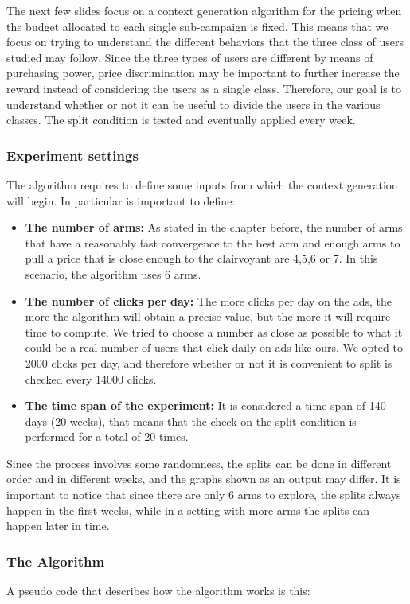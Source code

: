 The next few slides focus on a context generation algorithm for the pricing when the budget allocated to each single sub-campaign is fixed. This means that we focus on trying to understand the different behaviors that the three class of users studied may follow. Since the three types of users are different by means of purchasing power, price discrimination may be important to further increase the reward instead of considering the users as a single class. Therefore, our goal is to understand whether or not it can be useful to divide the users in the various classes. The split condition is tested and eventually applied every week.
\subsubsection{Experiment settings}
The algorithm requires to define some inputs from which the context generation will begin. In particular is important to define:
\begin{itemize}
	\item \textbf{The number of arms:} As stated in the chapter before, the number of arms that have a reasonably fast convergence to the best arm and enough arms to pull a price that is close enough to the clairvoyant are 4,5,6 or 7. In this scenario, the algorithm uses 6 arms.
	\item \textbf{The number of clicks per day:} The more clicks per day on the ads, the more the algorithm will obtain a precise value, but the more it will require time to compute. We tried to choose a number as close as possible to what it could be a real number of users that click daily on ads like ours. We opted to 2000 clicks per day, and therefore whether or not it is convenient to split is checked every 14000 clicks.
	\item \textbf{The time span of the experiment:} It is considered a time span of 140 days (20 weeks), that means that the check on the split condition is performed for a total of 20 times.
\end{itemize}
Since the process involves some randomness, the splits can be done in different order and in different weeks, and the graphs shown as an output may differ. It is important to notice that since there are only 6 arms to explore, the splits always happen in the first weeks, while in a setting with more arms the splits can happen later in time.
\subsubsection{The Algorithm}
A pseudo code that describes how the algorithm works is this:\\

